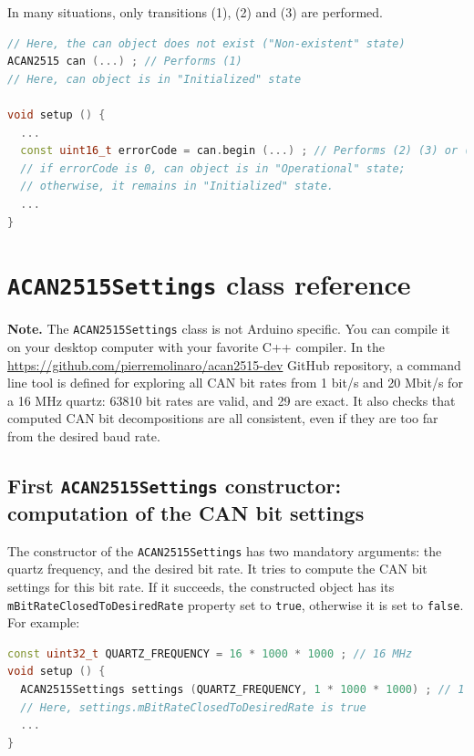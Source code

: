 \documentclass[10pt, a4paper, obeyspaces]{extarticle}
\newcommand \sectionLabel[2]{\section{#1}\label{sec:#2}}
\newcommand \subsectionLabel[2]{\subsection{#1}\label{subsec:#2}}
\begin{document}
In many situations, only transitions (1), (2) and (3) are performed.

{ \small\begin{lstlisting}[language=c++]
// Here, the can object does not exist ("Non-existent" state)
ACAN2515 can (...) ; // Performs (1)
// Here, can object is in "Initialized" state

void setup () {
  ...
  const uint16_t errorCode = can.begin (...) ; // Performs (2) (3) or (2) (4)
  // if errorCode is 0, can object is in "Operational" state;
  // otherwise, it remains in "Initialized" state.
  ...
}
\end{lstlisting}}









\sectionLabel{\texttt{ACAN2515Settings} class reference}{ACAN2515SettingsRef}

{\bf Note. } The \texttt{ACAN2515Settings} class is not Arduino specific. You can compile it on your desktop computer with your favorite C++ compiler. In the \url{https://github.com/pierremolinaro/acan2515-dev} GitHub repository, a command line tool is defined for exploring all CAN bit rates from 1 bit/s and 20 Mbit/s for a 16 MHz quartz: 63810 bit rates are valid, and 29 are exact. It also checks that computed CAN bit decompositions are all consistent, even if they are too far from the desired baud rate.



\subsectionLabel{First \texttt{ACAN2515Settings} constructor: computation of the CAN bit settings}{CANbitSettings}

The constructor of the \texttt{ACAN2515Settings} has two mandatory arguments: the quartz frequency, and the desired bit rate. It tries to compute the CAN bit settings for this bit rate. If it succeeds, the constructed object has its \texttt{mBitRateClosedToDesiredRate} property set to \texttt{true}, otherwise it is set to \texttt{false}. For example:
{ \small\begin{lstlisting}[language=c++]
const uint32_t QUARTZ_FREQUENCY = 16 * 1000 * 1000 ; // 16 MHz
void setup () {
  ACAN2515Settings settings (QUARTZ_FREQUENCY, 1 * 1000 * 1000) ; // 1 Mbit/s
  // Here, settings.mBitRateClosedToDesiredRate is true
  ...
}
\end{lstlisting}}
\end{document}
